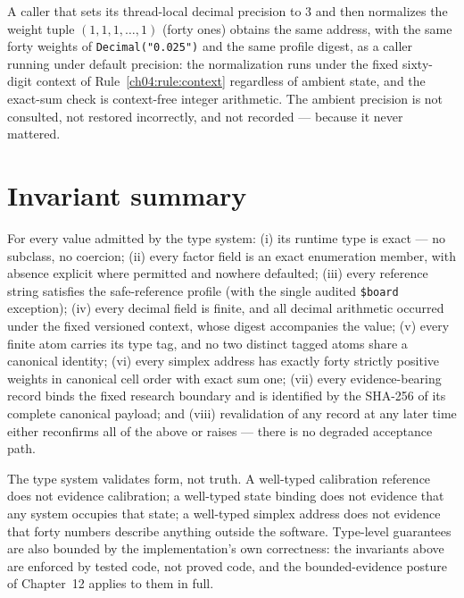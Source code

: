 \begin{example}\label{ch04:ex:ambient}
A caller that sets its thread-local decimal precision to $3$ and then
normalizes the weight tuple $(1, 1, 1, \ldots, 1)$ (forty ones) obtains
the same address, with the same forty weights of
\texttt{Decimal("0.025")} and the same profile digest, as a caller running
under default precision: the normalization runs under the fixed
sixty-digit context of Rule~\ref{ch04:rule:context} regardless of ambient
state, and the exact-sum check is context-free integer arithmetic. The
ambient precision is not consulted, not restored incorrectly, and not
recorded --- because it never mattered.
\end{example}

\section{Invariant summary}\label{ch04:sec:invariants}

\begin{invariant}\label{ch04:inv:summary}
For every value admitted by the type system:
(i) its runtime type is exact --- no subclass, no coercion;
(ii) every factor field is an exact enumeration member, with absence
explicit where permitted and nowhere defaulted;
(iii) every reference string satisfies the safe-reference profile (with
the single audited \texttt{\$board} exception);
(iv) every decimal field is finite, and all decimal arithmetic occurred
under the fixed versioned context, whose digest accompanies the value;
(v) every finite atom carries its type tag, and no two distinct tagged
atoms share a canonical identity;
(vi) every simplex address has exactly forty strictly positive weights in
canonical cell order with exact sum one;
(vii) every evidence-bearing record binds the fixed research boundary and
is identified by the SHA-256 of its complete canonical payload; and
(viii) revalidation of any record at any later time either reconfirms all
of the above or raises --- there is no degraded acceptance path.
\end{invariant}

\begin{threat}\label{ch04:threat:limits}
The type system validates form, not truth. A well-typed calibration
reference does not evidence calibration; a well-typed state binding does
not evidence that any system occupies that state; a well-typed simplex
address does not evidence that forty numbers describe anything outside the
software. Type-level guarantees are also bounded by the implementation's
own correctness: the invariants above are enforced by tested code, not
proved code, and the bounded-evidence posture of
Chapter~12 applies to them in full.
\end{threat}

